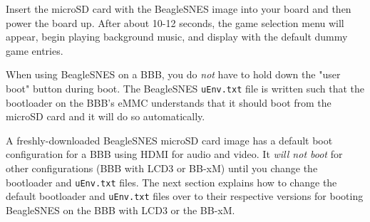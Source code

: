 Insert the microSD card with the BeagleSNES image into your board and then power the board up.  After about 10-12 seconds, the game selection menu will appear, begin playing background music, and display with the default dummy game entries. 

\begin{updateWarn}
When using BeagleSNES on a BBB, you do \emph{not} have to hold down the "user boot" button during boot.  The BeagleSNES \texttt{uEnv.txt} file is written such that the bootloader on the BBB's eMMC understands that it should boot from the microSD card and it will do so automatically.
\end{updateWarn}

\begin{updateWarn}
A freshly-downloaded BeagleSNES microSD card image has a default boot configuration for a BBB using HDMI for audio and video.  It \emph{will not boot} for other configurations (BBB with LCD3 or BB-xM) until you change the bootloader and \texttt{uEnv.txt} files. The next section explains how to change the default bootloader and \texttt{uEnv.txt} files over to their respective versions for booting BeagleSNES on the BBB with LCD3 or the BB-xM.
\end{updateWarn}
